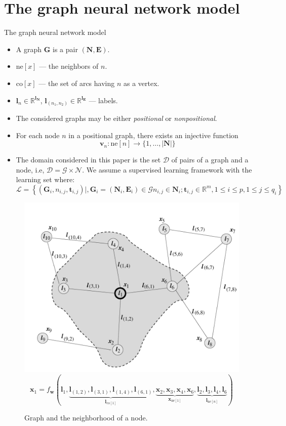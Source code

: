 \documentclass[10pt,aspectratio=169]{beamer}
\begin{document}
\section{The graph neural network model}
\begin{frame}[allowframebreaks]{The graph neural network model}

    \begin{itemize}
        \item A graph $\boldsymbol{G}$ is a pair $(\boldsymbol{N}, \boldsymbol{E})$.
        \item $\text{ne}[x]$ --- the neighbors of $n$.
        \item $\text{co}[x]$ --- the set of arcs having $n$ as a vertex.
        \item $\boldsymbol{l}_n \in \mathbb{R} ^ {\boldsymbol{l}_{\boldsymbol{N}}}$, $\boldsymbol{l}_{(n_1, n_2)} \in \mathbb{R} ^ {\boldsymbol{l}_{\boldsymbol{E}}}$ --- labels.
    \end{itemize}

    \framebreak
    \begin{itemize}
        \item The considered graphs may be either \emph{positional} or \emph{nonpositional}.
        \item For each node $n$ in a positional graph, there exists an injective function
              $$\boldsymbol{v}_n : \text{ne}[n] \rightarrow \{1, \ldots, |\boldsymbol{N}|\}$$
        \item The domain considered in this paper is the set $\mathcal{D}$ of pairs of a graph and a node, i.e, $\mathcal{D} = \mathcal{G} \times \mathcal{N}$.
              We assume a supervised learning framework with the learning set
              where:
              $$
                  \mathcal{L}=\left\{\left(\boldsymbol{G}_{i}, n_{i, j}, \boldsymbol{t}_{i, j}\right) \mid, \boldsymbol{G}_{i}=\left(\boldsymbol{N}_{i}, \boldsymbol{E}_{i}\right) \in \mathcal{G}
                  n_{i, j} \in \boldsymbol{N}_{i} ; \boldsymbol{t}_{i, j} \in \mathbb{R}^{m}, 1 \leq i \leq p, 1 \leq j \leq q_{i}\right\}
              $$
    \end{itemize}

    \begin{figure}
        \includegraphics[width=.34\textwidth]{pic/graph.png}
        $$\boldsymbol{x}_{1}=f_{\boldsymbol{w}}(\boldsymbol{l}_{1}, \underbrace{\boldsymbol{l}_{(1,2)}, \boldsymbol{l}_{(3,1)}, \boldsymbol{l}_{(1,4)}, \boldsymbol{l}_{(6,1)}}_{\boldsymbol{l}_{\text{co}[1]}}, \underbrace{\boldsymbol{x}_{2}, \boldsymbol{x}_{3}, \boldsymbol{x}_{4}, \boldsymbol{x}_{6}}_{\boldsymbol{x}_{\text{ne}[1]}}, \underbrace{\boldsymbol{l}_{2}, \boldsymbol{l}_{3}, \boldsymbol{l}_{4}, \boldsymbol{l}_{6}}_{\boldsymbol{l}_{\text{ne}[n]}})$$
        \caption{Graph and the neighborhood of a node.}
    \end{figure}


\end{frame}
\end{document}
